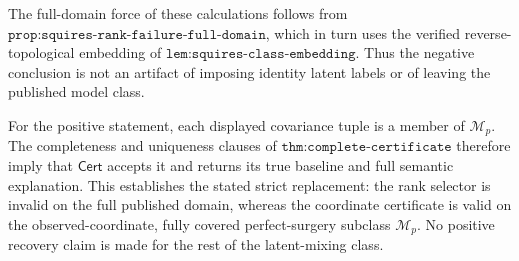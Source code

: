 The full-domain force of these calculations follows from
\(\texttt{prop:squires-rank-failure-full-domain}\), which in turn uses the
verified reverse-topological embedding of
\(\texttt{lem:squires-class-embedding}\).  Thus the negative conclusion
is not an artifact of imposing identity latent labels or of leaving the
published model class.

For the positive statement, each displayed covariance tuple is a member
of \(\mathcal M_p\).  The completeness and uniqueness clauses of
\(\texttt{thm:complete-certificate}\) therefore imply that
\(\mathsf{Cert}\) accepts it and returns its true baseline and full
semantic explanation.  This establishes the stated strict replacement:
the rank selector is invalid on the full published domain, whereas the
coordinate certificate is valid on the observed-coordinate, fully covered
perfect-surgery subclass \(\mathcal M_p\).  No positive recovery claim is
made for the rest of the latent-mixing class.
